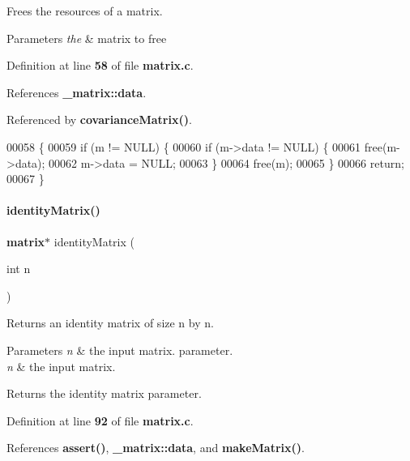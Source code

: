 Frees the resources of a matrix. 


\begin{DoxyParams}{Parameters}
{\em the} & matrix to free \\
\hline
\end{DoxyParams}


Definition at line \textbf{ 58} of file \textbf{ matrix.\+c}.



References \textbf{ \+\_\+matrix\+::data}.



Referenced by \textbf{ covariance\+Matrix()}.


\begin{DoxyCode}
00058                            \{
00059   \textcolor{keywordflow}{if} (m != NULL) \{
00060     \textcolor{keywordflow}{if} (m->data != NULL) \{
00061       free(m->data);
00062       m->data = NULL;
00063     \}
00064     free(m);
00065   \}
00066   \textcolor{keywordflow}{return};
00067 \}
\end{DoxyCode}
\mbox{\label{a00041_aa3f5e409b1641373be7cf7284e216d1a}} 
\paragraph{identity\+Matrix()}
{\footnotesize\ttfamily \textbf{ matrix}$\ast$ identity\+Matrix (\begin{DoxyParamCaption}\item[{int}]{n }\end{DoxyParamCaption})}



Returns an identity matrix of size n by n. 


\begin{DoxyParams}{Parameters}
{\em n} & the input matrix. parameter.\\
\hline
{\em n} & the input matrix. \\
\hline
\end{DoxyParams}
\begin{DoxyReturn}{Returns}
the identity matrix parameter. 
\end{DoxyReturn}


Definition at line \textbf{ 92} of file \textbf{ matrix.\+c}.



References \textbf{ assert()}, \textbf{ \+\_\+matrix\+::data}, and \textbf{ make\+Matrix()}.


